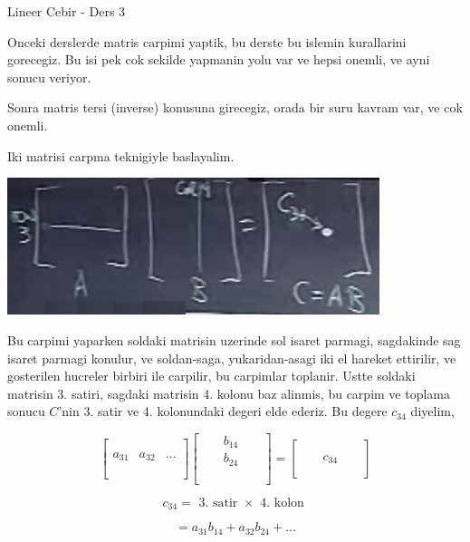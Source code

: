 \documentclass[12pt,fleqn]{article}\usepackage{../common}
\begin{document}
Lineer Cebir - Ders 3

Onceki derslerde matris carpimi yaptik, bu derste bu islemin kurallarini
gorecegiz. Bu isi pek cok sekilde yapmanin yolu var ve hepsi onemli, ve
ayni sonucu veriyor.

Sonra matris tersi (inverse) konusuna girecegiz, orada bir suru kavram var,
ve cok onemli. 

Iki matrisi carpma teknigiyle baslayalim. 

\includegraphics[height=4cm]{3_01.png}

Bu carpimi yaparken soldaki matrisin uzerinde sol isaret parmagi,
sagdakinde sag isaret parmagi konulur, ve soldan-saga, yukaridan-asagi iki
el hareket ettirilir, ve gosterilen hucreler birbiri ile carpilir, bu
carpimlar toplanir. Ustte soldaki matrisin 3. satiri, sagdaki matrisin
4. kolonu baz alinmis, bu carpim ve toplama sonucu $C$'nin 3. satir ve
4. kolonundaki degeri elde ederiz. Bu degere $c_{34}$ diyelim,

$$ 
\left[\begin{array}{rrrr}
\\
\\
a_{31} & a_{32} & \dots \\
\\
\\
\end{array}\right]
\left[\begin{array}{rrrrr}
& & b_{14} & & \\
& & b_{24} & & \\
& &  & & \\
& &  & & \\
& &  & & 
\end{array}\right] 
=
\left[\begin{array}{rrrrr}
& &  & & \\
& &  & & \\
& & c_{34} & & \\
& &  & & \\
& &  & & 
\end{array}\right]
$$

$$ c_{34} = \textrm{ 3. satir } \times \textrm{ 4. kolon } $$

$$ = a_{31}b_{14} + a_{32}b_{24} + ... $$
\end{document}
